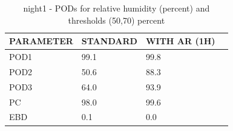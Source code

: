 \begin{table}[p!]
\begin{center}
\begin{tabular}{|l|l|l|l|}
\hline
\multicolumn{1}{|c|}{\cellcolor[HTML]{C0C0C0}\textbf{PARAMETER}} & \multicolumn{1}{c|}{\cellcolor[HTML]{C0C0C0}\textbf{STANDARD}} & \multicolumn{1}{c|}{\cellcolor[HTML]{C0C0C0}\textbf{WITH AR (1H)}} \\
\hline
\cellcolor[HTML]{C0C0C0}POD1  & 99.1                                & 99.8         \\
\cellcolor[HTML]{C0C0C0}POD2  & 50.6                                & 88.3         \\
\cellcolor[HTML]{C0C0C0}POD3  & 64.0                                & 93.9         \\
\cellcolor[HTML]{C0C0C0}PC    & 98.0                                & 99.6           \\
\cellcolor[HTML]{C0C0C0}EBD   & 0.1                                & 0.0          \\
\hline
\end{tabular}
\caption{night1 - PODs for relative humidity (percent) and thresholds (50,70) percent}
\label{tab:podrhFT:night1}
\end{center}
\end{table}
